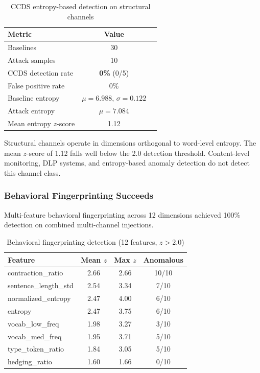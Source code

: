 \documentclass[11pt]{article}
\begin{document}
\begin{table}[h]
\centering
\caption{CCDS entropy-based detection on structural channels}
\label{tab:ccds}
\begin{tabular}{@{}lcc@{}}
\toprule
\textbf{Metric} & \textbf{Value} \\
\midrule
Baselines & 30 \\
Attack samples & 10 \\
CCDS detection rate & \textbf{0\%} (0/5) \\
False positive rate & 0\% \\
Baseline entropy & $\mu = 6.988$, $\sigma = 0.122$ \\
Attack entropy & $\mu = 7.084$ \\
Mean entropy $z$-score & 1.12 \\
\bottomrule
\end{tabular}
\end{table}

Structural channels operate in dimensions orthogonal to word-level entropy.
The mean $z$-score of 1.12 falls well below the 2.0 detection threshold.
Content-level monitoring, DLP systems, and entropy-based anomaly detection
do not detect this channel class.

\subsubsection{Behavioral Fingerprinting Succeeds}

Multi-feature behavioral fingerprinting across 12 dimensions achieved
100\% detection on combined multi-channel injections.

\begin{table}[h]
\centering
\caption{Behavioral fingerprinting detection (12 features, $z > 2.0$)}
\label{tab:fingerprint}
\begin{tabular}{@{}lccc@{}}
\toprule
\textbf{Feature} & \textbf{Mean $z$} & \textbf{Max $z$} & \textbf{Anomalous} \\
\midrule
contraction\_ratio & 2.66 & 2.66 & 10/10 \\
sentence\_length\_std & 2.54 & 3.34 & 7/10 \\
normalized\_entropy & 2.47 & 4.00 & 6/10 \\
entropy & 2.47 & 3.75 & 6/10 \\
vocab\_low\_freq & 1.98 & 3.27 & 3/10 \\
vocab\_med\_freq & 1.95 & 3.71 & 5/10 \\
type\_token\_ratio & 1.84 & 3.05 & 5/10 \\
hedging\_ratio & 1.60 & 1.66 & 0/10 \\
\bottomrule
\end{tabular}
\end{table}
\end{document}
